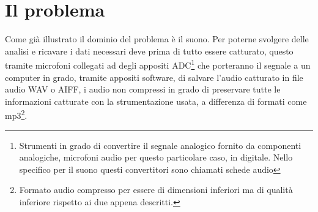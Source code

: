 \chapter{Il problema}
Come già illustrato il dominio del problema è il suono. Per poterne svolgere delle analisi e ricavare i dati necessari deve prima di tutto essere catturato, questo tramite microfoni collegati ad degli appositi ADC\footnote{Strumenti in grado di convertire il segnale analogico fornito da componenti analogiche, microfoni audio per questo particolare caso, in digitale. Nello specifico per il suono questi convertitori sono chiamati schede audio} che porteranno il segnale a un computer in grado, tramite appositi software, di salvare l'audio catturato in file audio WAV o AIFF, i audio non compressi in grado di preservare tutte le informazioni catturate con la strumentazione usata, a differenza di formati come mp3\footnote{Formato audio compresso per essere di dimensioni inferiori ma di qualità inferiore rispetto ai due appena descritti.}.

